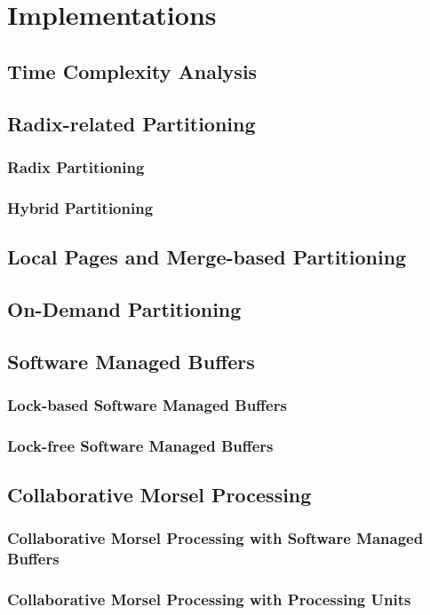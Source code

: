 
\chapter{Implementations}\label{chapter:implementations}

\section{Time Complexity Analysis}

\section{Radix-related Partitioning}
\subsection{Radix Partitioning}
\subsection{Hybrid Partitioning}

\section{Local Pages and Merge-based Partitioning}

\section{On-Demand Partitioning}


\section{Software Managed Buffers}
\subsection{Lock-based Software Managed Buffers}
\subsection{Lock-free Software Managed Buffers}

\section{Collaborative Morsel Processing}
\subsection{Collaborative Morsel Processing with Software Managed Buffers}
\subsection{Collaborative Morsel Processing with Processing Units}
